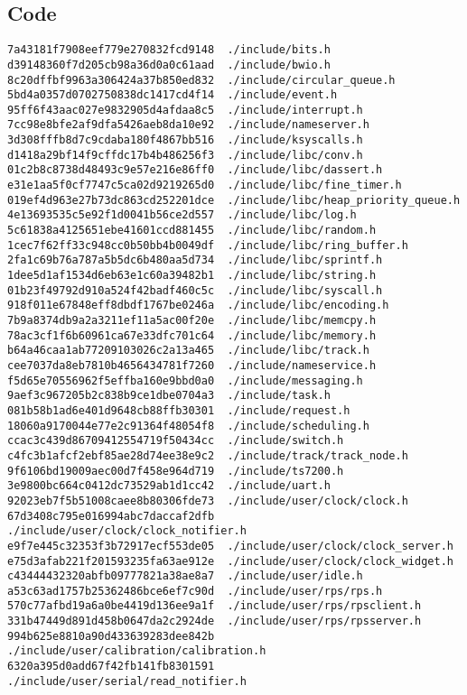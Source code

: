 \documentclass{article}
\begin{document}
\subsection{Code}
\begin{verbatim}
7a43181f7908eef779e270832fcd9148  ./include/bits.h
d39148360f7d205cb98a36d0a0c61aad  ./include/bwio.h
8c20dffbf9963a306424a37b850ed832  ./include/circular_queue.h
5bd4a0357d0702750838dc1417cd4f14  ./include/event.h
95ff6f43aac027e9832905d4afdaa8c5  ./include/interrupt.h
7cc98e8bfe2af9dfa5426aeb8da10e92  ./include/nameserver.h
3d308fffb8d7c9cdaba180f4867bb516  ./include/ksyscalls.h
d1418a29bf14f9cffdc17b4b486256f3  ./include/libc/conv.h
01c2b8c8738d48493c9e57e216e86ff0  ./include/libc/dassert.h
e31e1aa5f0cf7747c5ca02d9219265d0  ./include/libc/fine_timer.h
019ef4d963e27b73dc863cd252201dce  ./include/libc/heap_priority_queue.h
4e13693535c5e92f1d0041b56ce2d557  ./include/libc/log.h
5c61838a4125651ebe41601ccd881455  ./include/libc/random.h
1cec7f62ff33c948cc0b50bb4b0049df  ./include/libc/ring_buffer.h
2fa1c69b76a787a5b5dc6b480aa5d734  ./include/libc/sprintf.h
1dee5d1af1534d6eb63e1c60a39482b1  ./include/libc/string.h
01b23f49792d910a524f42badf460c5c  ./include/libc/syscall.h
918f011e67848eff8dbdf1767be0246a  ./include/libc/encoding.h
7b9a8374db9a2a3211ef11a5ac00f20e  ./include/libc/memcpy.h
78ac3cf1f6b60961ca67e33dfc701c64  ./include/libc/memory.h
b64a46caa1ab77209103026c2a13a465  ./include/libc/track.h
cee7037da8eb7810b4656434781f7260  ./include/nameservice.h
f5d65e70556962f5effba160e9bbd0a0  ./include/messaging.h
9aef3c967205b2c838b9ce1dbe0704a3  ./include/task.h
081b58b1ad6e401d9648cb88ffb30301  ./include/request.h
18060a9170044e77e2c91364f48054f8  ./include/scheduling.h
ccac3c439d86709412554719f50434cc  ./include/switch.h
c4fc3b1afcf2ebf85ae28d74ee38e9c2  ./include/track/track_node.h
9f6106bd19009aec00d7f458e964d719  ./include/ts7200.h
3e9800bc664c0412dc73529ab1d1cc42  ./include/uart.h
92023eb7f5b51008caee8b80306fde73  ./include/user/clock/clock.h
67d3408c795e016994abc7daccaf2dfb  ./include/user/clock/clock_notifier.h
e9f7e445c32353f3b72917ecf553de05  ./include/user/clock/clock_server.h
e75d3afab221f201593235fa63ae912e  ./include/user/clock/clock_widget.h
c43444432320abfb09777821a38ae8a7  ./include/user/idle.h
a53c63ad1757b25362486bce6ef7c90d  ./include/user/rps/rps.h
570c77afbd19a6a0be4419d136ee9a1f  ./include/user/rps/rpsclient.h
331b47449d891d458b0647da2c2924de  ./include/user/rps/rpsserver.h
994b625e8810a90d433639283dee842b  ./include/user/calibration/calibration.h
6320a395d0add67f42fb141fb8301591  ./include/user/serial/read_notifier.h

\end{verbatim}
\end{document}
